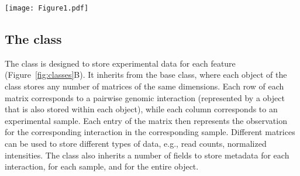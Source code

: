 \documentclass[10pt,a4paper,twocolumn]{article}
\begin{document}
\begin{figure*}
\centering
\texttt{[image: Figure1.pdf]}
\caption{Overview of the classes in the \textit{InteractionSet} package.
Relevant slots of each class (i.e., data values stored in each object of the class) are labelled with a preceding ``@''.
(A) The  class represents pairwise interactions between genomic regions by storing pairs of anchor indices that refer to coordinates in a  object.
(B) The  class stores experimental data in an ``assays'' matrix where each row is an interaction and each column is a sample.
(C) The  class represents the interaction space as a matrix, where each cell represents an interaction between the corresponding row/column regions.
}
\label{fig:classes}
\end{figure*}

\subsection*{The  class}
The  class is designed to store experimental data for each feature (Figure~\ref{fig:classes}B).
It inherits from the  base class, where each object of the class stores any number of matrices of the same dimensions.
Each row of each matrix corresponds to a pairwise genomic interaction (represented by a  object that is also stored within each  object), while each column corresponds to an experimental sample.
Each entry of the matrix then represents the observation for the corresponding interaction in the corresponding sample.
Different matrices can be used to store different types of data, e.g., read counts, normalized intensities.
The  class also inherits a number of fields to store metadata for each interaction, for each sample, and for the entire object.
\end{document}
